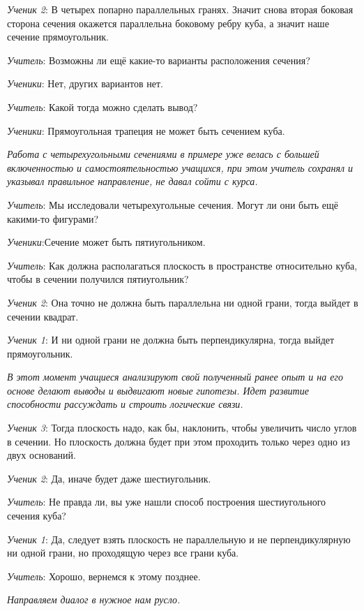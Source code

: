 \documentclass[a4paper,14pt,russian]{extreport}
\begin{document}
\textit{Ученик 2}: В четырех попарно параллельных гранях. Значит снова вторая боковая сторона сечения окажется параллельна боковому ребру куба, а значит наше сечение прямоугольник.

\textit{Учитель}: Возможны ли ещё какие-то варианты расположения сечения?

\textit{Ученики}: Нет, других вариантов нет.

\textit{Учитель}: Какой тогда можно сделать вывод?

\textit{Ученики}: Прямоугольная трапеция не может быть сечением куба.

\textit{Работа с четырехугольными сечениями в примере уже велась с большей включенностью и самостоятельностью учащихся, при этом учитель сохранял и указывал правильное направление, не давал сойти с курса.}

\textit{Учитель}: Мы исследовали четырехугольные сечения. Могут ли они быть ещё какими-то фигурами?

\textit{Ученики}:Сечение может быть пятиугольником.

\textit{Учитель}: Как должна располагаться плоскость в пространстве относительно куба, чтобы в сечении получился пятиугольник?

\textit{Ученик 2}: Она точно не должна быть параллельна ни одной грани, тогда выйдет в сечении квадрат.

\textit{Ученик 1}: И ни одной грани не должна быть перпендикулярна, тогда выйдет прямоугольник.

\textit{В этот момент учащиеся анализируют свой полученный ранее опыт и на его основе делают выводы и выдвигают новые гипотезы. Идет развитие способности рассуждать и строить логические связи.}

\textit{Ученик 3}: Тогда плоскость надо, как бы, наклонить, чтобы увеличить число углов в сечении. Но плоскость должна будет при этом проходить только через одно из двух оснований.

\textit{Ученик 2}: Да, иначе будет даже шестиугольник.

\textit{Учитель}: Не правда ли, вы уже нашли способ построения шестиугольного сечения куба?

\textit{Ученик 1}: Да, следует взять плоскость не параллельную и не перпендикулярную ни одной грани, но проходящую через все грани куба.

\textit{Учитель}: Хорошо, вернемся к этому позднее. 

\textit{Направляем диалог в нужное нам русло.}
\end{document}
